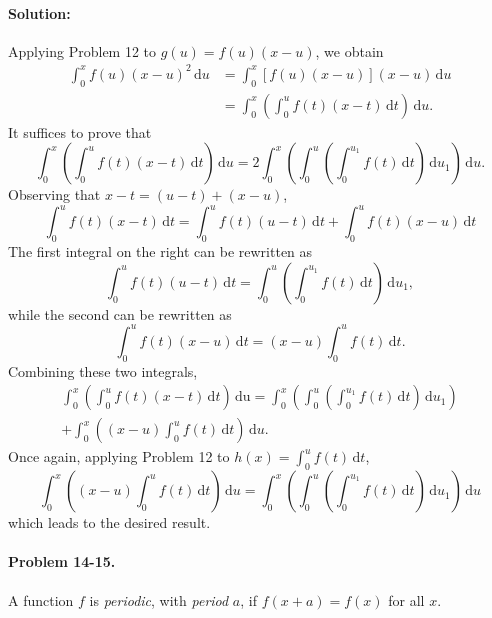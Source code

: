 \documentclass{article}
\begin{document}
\paragraph{Solution:} Applying Problem 12 to $g(u) = f(u)(x - u)$, we obtain
\begin{align*}
  \int_0^x f(u)(x - u)^2 \,\mathrm{d}u
  &= \int_0^x [f(u)(x - u)](x - u) \,\mathrm{d}u \\
  &= \int_0^x \left(\int_0^u f(t)(x - t) \,\mathrm{d}t\right) \,\mathrm{d}u.
\end{align*} It suffices to prove that \begin{equation*}
  \int_0^x \left(\int_0^u f(t)(x - t) \,\mathrm{d}t\right) \,\mathrm{d}u
  = 2\int_0^x \left(\int_0^u \left(\int_0^{u_1} f(t) \,\mathrm{d}t\right)
    \,\mathrm{d}u_1\right) \,\mathrm{d}u.
\end{equation*} Observing that $x - t = (u - t) + (x - u)$, \begin{equation*}
  \int_0^u f(t)(x - t) \,\mathrm{d}t
  = \int_0^u f(t)(u - t) \,\mathrm{d}t + \int_0^u f(t)(x - u) \,\mathrm{d}t
\end{equation*} The first integral on the right can be rewritten as
\begin{equation*}
  \int_0^u f(t)(u - t) \,\mathrm{d}t
  = \int_0^u \left(\int_0^{u_1} f(t) \,\mathrm{d}t\right) \,\mathrm{d}u_1,
\end{equation*} while the second can be rewritten as \begin{equation*}
  \int_0^u f(t)(x - u) \,\mathrm{d}t
  = (x - u)\int_0^u f(t) \,\mathrm{d}t.
\end{equation*} Combining these two integrals, \begin{multline*}
  \int_0^x \left(\int_0^u f(t)(x - t) \,\mathrm{d}t\right) \,\mathrm{du}
  = \int_0^x \left(
      \int_0^u \left(\int_0^{u_1} f(t) \,\mathrm{d}t\right) \,\mathrm{d}u_1
    \right) \\
  + \int_0^x \left(
      (x - u)\int_0^u f(t) \,\mathrm{d}t
    \right) \,\mathrm{d}u.
\end{multline*} Once again, applying Problem 12 to $h(x) = \int_0^u f(t)
\,\mathrm{d}t$, \begin{equation*}
  \int_0^x \left((x - u)\int_0^u f(t) \,\mathrm{d}t\right) \,\mathrm{d}u
  = \int_0^x \left(
    \int_0^u \left(\int_0^{u_1} f(t) \,\mathrm{d}t\right) \,\mathrm{d}u_1
  \right) \,\mathrm{d}u
\end{equation*} which leads to the desired result.

\paragraph{Problem 14-15.} A function $f$ is \emph{periodic}, with
\emph{period} $a$, if $f(x + a) = f(x)$ for all $x$.
\end{document}
